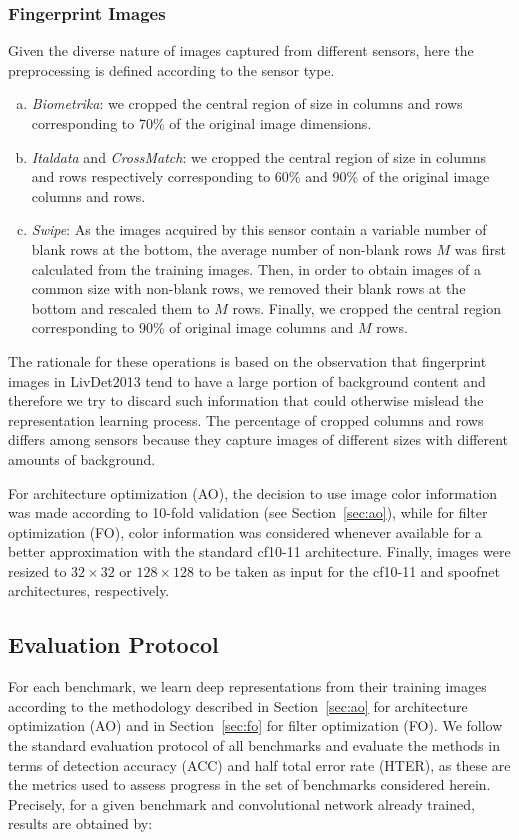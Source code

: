\subsubsection{Fingerprint Images}
Given the diverse nature of images captured from different sensors, here the preprocessing is defined according to the sensor type.
\begin{enumerate}[(a)]
\item \emph{Biometrika}: we cropped the central region of size in columns and rows corresponding to 70\% of the original image dimensions. 
\item \emph{Italdata} and \emph{CrossMatch}: we cropped the central region of size in columns and rows respectively corresponding to 60\% and 90\% of the original image columns and rows.
\item \emph{Swipe}: As the images acquired by this sensor contain a variable number of blank rows at the bottom, the average number of non-blank rows $M$ was first calculated from the training images.
Then, in order to obtain images of a common size with non-blank rows, we removed their blank rows at the bottom and rescaled them to $M$ rows. Finally, we cropped the central region corresponding to 90\% of original image columns and $M$ rows.
\end{enumerate}

The rationale for these operations is based on the observation that fingerprint images in LivDet2013 tend to have a large portion of background content and therefore we try to discard such information that could otherwise mislead the representation learning process.
The percentage of cropped columns and rows differs among sensors because they capture images of different sizes with different amounts of background.

For architecture optimization (AO), the decision to use image color information was made according to 10-fold validation (see Section~\ref{sec:ao}), while for filter optimization (FO), color information was considered whenever available for a better approximation with the standard cf10-11 architecture. Finally, images were resized to $32\times32$ or $128\times128$ to be taken as input for the cf10-11 and spoofnet architectures, respectively. 

\subsection{Evaluation Protocol}
\label{sec:evalprot}

For each benchmark, we learn deep representations from their training images according to the methodology described in Section~\ref{sec:ao} for architecture optimization (AO) and in Section~\ref{sec:fo} for filter optimization (FO).
We follow the standard evaluation protocol of all benchmarks and evaluate the methods in terms of detection accuracy (ACC) and half total error rate (HTER), as these are the metrics used to assess progress in the set of benchmarks considered herein. Precisely, for a given benchmark and convolutional network already trained, results are obtained by:

